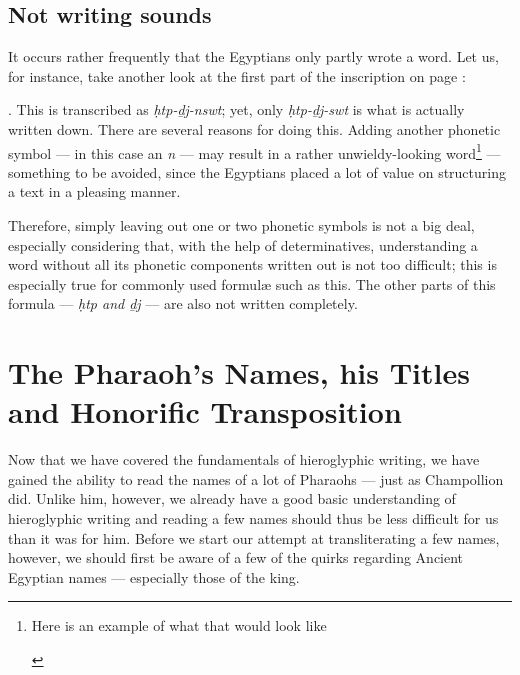 \documentclass[a5paper,twoside,11pt]{report}
\begin{document}
  \chapter*{Not writing sounds}
		It occurs rather frequently that the Egyptians only partly wrote a word. Let us, for instance, take another look at the first part of the inscription on page \pageref{fig:2}: \begin{hieroglyph}{\leavevmode {}\HinterSignsSpace
{}\HinterSignsSpace
{}}\end{hieroglyph}. This is transcribed as \textit{ḥtp-ḏj-nswt}; yet, only \textit{ḥtp-ḏj-swt} is what is actually written down. There are several reasons for doing this. Adding another phonetic symbol — in this case an \textit{n} — may result in a rather unwieldy-looking word\footnote{Here is an example of what that would look like \begin{hieroglyph}{\leavevmode {}\HinterSignsSpace
{}\HinterSignsSpace
{}\HinterSignsSpace
{}}\end{hieroglyph}} — something to be avoided, since the Egyptians placed a lot of value on structuring a text in a pleasing manner.

		Therefore, simply leaving out one or two phonetic symbols is not a big deal, especially considering that, with the help of determinatives, understanding a word without all its phonetic components written out is not too difficult; this is especially true for commonly used formulæ such as this. The other parts of this formula — \textit{ḥtp and ḏj} — are also not written completely.

\part*{The Pharaoh’s Names, his Titles and Honorific Transposition}

	Now that we have covered the fundamentals of hieroglyphic writing, we have gained the ability to read the names of a lot of Pharaohs — just as Champollion did. Unlike him, however, we already have a good basic understanding of hieroglyphic writing and reading a few names should thus be less difficult for us than it was for him. Before we start our attempt at transliterating a few names, however, we should first be aware of a few of the quirks regarding Ancient Egyptian names — especially those of the king.
\end{document}
